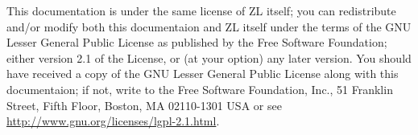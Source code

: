 This documentation is under the same license of ZL itself; you can
redistribute and/or modify both this documentaion and ZL itself under
the terms of the GNU Lesser General Public License as published by the
Free Software Foundation; either version 2.1 of the License, or (at
your option) any later version.  You should have received a copy of
the GNU Lesser General Public License along with this documentaion; if
not, write to the Free Software Foundation, Inc., 51 Franklin Street,
Fifth Floor, Boston, MA 02110-1301 USA or see
\url{http://www.gnu.org/licenses/lgpl-2.1.html}.
